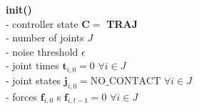 \documentclass{standalone}
\newcommand{\force}{\mathbf{f}}
\newcommand{\fitz}{\force_{i, 0}}
\newcommand{\fitm}{\force_{i, t-1}}
\newcommand{\joint}{\mathbf{j}}
\newcommand{\jitz}{\joint_{i, 0}}
\newcommand{\cs}{\mathbf{C}}
\newcommand{\nt}{\epsilon}
\newcommand{\jtiz}{\mathbf{t}_{i, 0}}
\begin{document}
\begin{algorithm}[H]
	\textbf{init()}  \\
	\vspace{0.1cm}
	\hspace{0.5cm} - controller state $\cs = $ \textbf{TRAJ} \\
	\hspace{0.5cm} - number of joints $J$ \\
	\hspace{0.5cm} - noise threshold $\nt$ \\
	\hspace{0.5cm} - joint times $\jtiz = 0\,\, \forall i\in J$ \\
	\hspace{0.5cm} - joint states $\jitz = \text{NO\_CONTACT}\,\, \forall i\in J$ \\
	\hspace{0.5cm} -  forces $\fitz$ s $ \fitm = 0\,\, \forall i\in J$ \\
	

\end{algorithm}
\end{document}
